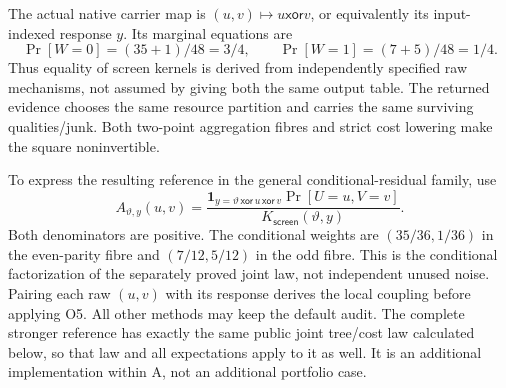 \documentclass[11pt,a4paper]{article}
\theoremstyle{definition}
\begin{document}
The actual native carrier map is $(u,v)\mapsto u\mathbin{\mathsf{xor}}v$,
or equivalently its input-indexed response $y$. Its marginal equations are
\[
\Pr[W=0]=(35+1)/48=3/4,\qquad
\Pr[W=1]=(7+5)/48=1/4.
\]
Thus equality of screen kernels is derived from independently specified
raw mechanisms, not assumed by giving both the same output table.
The returned evidence chooses the same resource partition and carries
the same surviving qualities/junk. Both two-point aggregation fibres
and strict cost lowering make the square noninvertible.

To express the resulting reference in the general conditional-residual
family, use
\[
A_{\vartheta,y}(u,v)=
\frac{\mathbf1_{y=\vartheta\,\mathsf{xor}\,u\,\mathsf{xor}\,v}
      \Pr[U=u,V=v]}{K_{\mathsf{screen}}(\vartheta,y)}.
\]
Both denominators are positive. The conditional weights are
$(35/36,1/36)$ in the even-parity fibre and $(7/12,5/12)$ in the odd
fibre. This is the conditional factorization of the separately proved
joint law, not independent unused noise. Pairing each raw $(u,v)$ with
its response derives the local coupling before applying O5.
All other methods may keep the default audit. The complete stronger
reference has exactly the same public joint tree/cost law calculated
below, so that law and all expectations apply to it as well. It is an
additional implementation within A, not an additional portfolio case.
\end{document}

